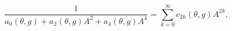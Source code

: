 \begin{equation}
\frac{1}{a_{0}(\theta ,g)+a_{2}(\theta ,g)A^{2}+a_{4}(\theta ,g)A^{4}}%
=\sum_{k=0}^{\infty }c_{2k}(\theta ,g)A^{2k},
\end{equation}

